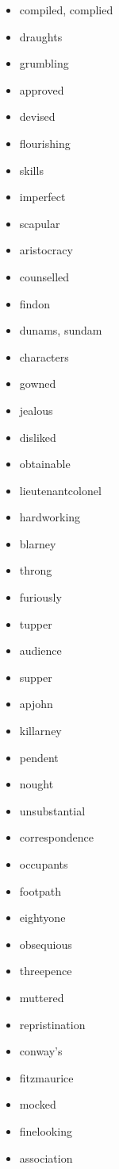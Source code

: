 \documentclass{article}
\begin{document}
\begin{itemize}
    \item compiled, complied
    \item draughts
    \item grumbling
    \item approved
    \item devised
    \item flourishing
    \item skills
    \item imperfect
    \item scapular
    \item aristocracy
    \item counselled
    \item findon
    \item dunams, sundam
    \item characters
    \item gowned
    \item jealous
    \item disliked
    \item obtainable
    \item lieutenantcolonel
    \item hardworking
    \item blarney
    \item throng
    \item furiously
    \item tupper
    \item audience
    \item supper
    \item apjohn
    \item killarney
    \item pendent
    \item nought
    \item unsubstantial
    \item correspondence
    \item occupants
    \item footpath
    \item eightyone
    \item obsequious
    \item threepence
    \item muttered
    \item repristination
    \item conway's
    \item fitzmaurice
    \item mocked
    \item finelooking
    \item association

\end{itemize}
\end{document}
